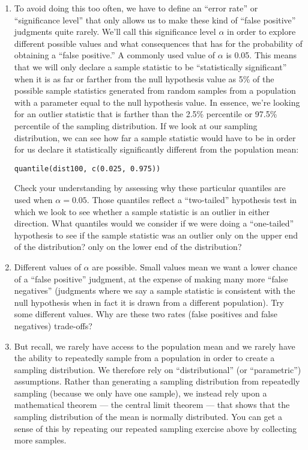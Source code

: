 \documentclass[a4paper,12pt]{article}
\begin{document}
\begin{enumerate}
\item To avoid doing this too often, we have to define an ``error rate'' or ``significance level'' that only allows us to make these kind of ``false positive'' judgments quite rarely. We'll call this significance level $\alpha$ in order to explore different possible values and what consequences that has for the probability of obtaining a ``false positive.'' A commonly used value of $\alpha$ is 0.05. This means that we will only declare a sample statistic to be ``statistically significant'' when it is as far or farther from the null hypothesis value as 5\% of the possible sample statistics generated from random samples from a population with a parameter equal to the null hypothesis value. In essence, we're looking for an outlier statistic that is farther than the 2.5\% percentile or 97.5\% percentile of the sampling distribution. If we look at our sampling distribution, we can see how far a sample statistic would have to be in order for us declare it statistically significantly different from the population mean:

\begin{verbatim}
quantile(dist100, c(0.025, 0.975))
\end{verbatim}

\noindent Check your understanding by assessing why these particular quantiles are used when $\alpha = 0.05$. Those quantiles reflect a ``two-tailed'' hypothesis test in which we look to see whether a sample statistic is an outlier in either direction. What quantiles would we consider if we were doing a ``one-tailed'' hypothesis to see if the sample statistic was an outlier only on the upper end of the distribution? only on the lower end of the distribution?

\vspace{4em}

\item Different values of $\alpha$ are possible. Small values mean we want a lower chance of a ``false positive'' judgment, at the expense of making many more ``false negatives'' (judgments where we say a sample statistic is consistent with the null hypothesis when in fact it is drawn from a different population). Try some different values. Why are these two rates (false positives and false negatives) trade-offs?

\vspace{4em}

\item But recall, we rarely have access to the population mean and we rarely have the ability to repeatedly sample from a population in order to create a sampling distribution. We therefore rely on ``distributional'' (or ``parametric'') assumptions. Rather than generating a sampling distribution from repeatedly sampling (because we only have one sample), we instead rely upon a mathematical theorem --- the central limit theorem --- that shows that the sampling distribution of the mean is normally distributed. You can get a sense of this by repeating our repeated sampling exercise above by collecting more samples.


\end{enumerate}
\end{document}
